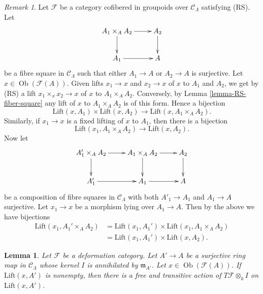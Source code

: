 \documentclass{stacks-project}
\theoremstyle{plain}
\newtheorem{lemma}[subsection]{Lemma}
\theoremstyle{definition}
\theoremstyle{remark}
\newtheorem{remark}[subsection]{Remark}
\numberwithin{equation}{subsection}
\def\Ob{\mathop{\mathrm{Ob}}\nolimits}
\begin{document}
\begin{remark}
\label{remark-lift-bijections}
Let $\mathcal{F}$ be a category cofibered in groupoids over $\mathcal
C_\Lambda$ satisfying (RS).  Let
$$
\xymatrix{
A_1 \times_A A_2 \ar[r] \ar[d] & A_2 \ar[d] \\
A_1 \ar[r] & A
}
$$
be a fibre square in $\mathcal{C}_\Lambda$ such that either
$A_1 \to A$ or $A_2 \to A$ is surjective. Let
$x \in \Ob(\mathcal{F}(A))$. Given
lifts $x_1 \to x$ and $x_2 \to x$ of $x$ to $A_1$ and $A_2$, we get by
(RS) a lift $x_1 \times_x x_2 \to x$ of $x$ to $A_1 \times_A A_2$.
Conversely, by
Lemma \ref{lemma-RS-fiber-square}
any lift of $x$ to $A_1 \times_A A_2$ is of this form.
Hence a bijection
$$
\text{Lift}(x, A_1) \times \text{Lift}(x, A_2)
\longrightarrow
\text{Lift}(x, A_1 \times_A A_2).
$$
Similarly, if $x_1 \to x$ is a fixed lifting of $x$ to $A_1$, then
there is a bijection
$$
\text{Lift}(x_1, A_1 \times_A A_2)
\longrightarrow
\text{Lift}(x, A_2).
$$
Now let
$$
\xymatrix{
A_1' \times_A A_2 \ar[r] \ar[d] & A_1 \times_A A_2 \ar[r] \ar[d] & A_2
\ar[d] \\
A_1' \ar[r] & A_1 \ar[r] & A
}
$$
be a composition of fibre squares in $\mathcal{C}_\Lambda$ with
both $A'_1 \to A_1$ and $A_1 \to A$ surjective. Let $x_1 \to x$ be a morphism
lying over $A_1 \to A$. Then by the above we have bijections
\begin{align*}
\text{Lift}(x_1, A_1' \times_A A_2)
& = \text{Lift}(x_1, A_1') \times \text{Lift}(x_1, A_1 \times_A A_2) \\
& = \text{Lift}(x_1, A_1') \times \text{Lift}(x, A_2).
\end{align*}
\end{remark}

\begin{lemma}
\label{lemma-free-transitive-action}
Let $\mathcal{F}$ be a deformation category.
Let $A' \to A$ be a surjective ring map in
$\mathcal{C}_\Lambda$ whose kernel $I$ is annihilated
by $\mathfrak m_{A'}$. Let $x \in \Ob(\mathcal{F}(A))$.
If $\text{Lift}(x, A')$ is nonempty,
then there is a free and transitive action of
$T\mathcal{F} \otimes_k I$ on $\text{Lift}(x, A')$.
\end{lemma}
\end{document}
